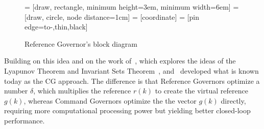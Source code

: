 \begin{figure}
  \centering
      = [draw, rectangle, minimum height=3em, minimum width=6em]
        = [draw, circle, node distance=1cm]
      = [coordinate]
   = [pin edge={to-,thin,black}]
  \caption{Reference Governor's block diagram}%
  \label{fig:rg-block-diagram}
\end{figure}

Building on this idea and on the work of~\textcite{kapasouris.athans.ea:design},
which explores the ideas of the Lyapunov Theorem and Invariant Sets
Theorem~\parencite{blanchini.miani:set-theoretic},
\textcite{bemporad.casavola.ea:nonlinear}
and~\textcite{casavola.mosca.ea:robust} developed what is known today as the
\ac{CG} approach. The difference is that Reference Governors optimize a number
\(\delta\), which multiplies the reference \(r(k)\) to create the virtual reference
\(g(k)\), whereas Command Governors optimize the the vector \(g(k)\) directly,
requiring more computational processing power but yielding better closed-loop
performance.

